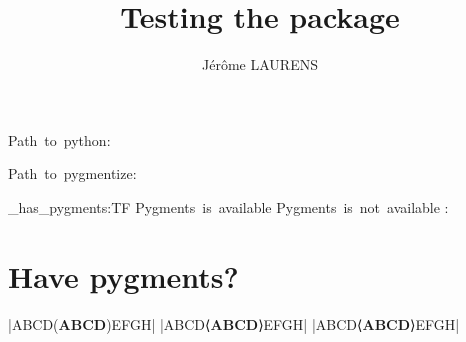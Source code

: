 \documentclass[10pt,a4paper]{article}
\begin{document}
\title{Testing the  package}
\author{Jérôme LAURENS}
\maketitle

\ExplSyntaxOn
\RenewDocumentCommand\CDRTest {} {
  \par\noindent
  Path~to~\textsf{python}:~\texttt{}
  \par\noindent
  Path~to~\textsf{pygmentize}:~\texttt{}
  \par\noindent
  \CDR_has_pygments:TF { Pygments~is~available } { Pygments~is~not~available
}:~%
  \par\noindent
}
\ExplSyntaxOff

\section{Have \textsf{pygments}?}
\CDRTest
{}
\CDRTest
\CDRCode[escapeinside=()]|ABCD(\textbf{ABCD})EFGH|
\CDRCode[escapeinside=⟨⟩]|ABCD⟨\textbf{ABCD}⟩EFGH|
\CDRCode[tags=src]|ABCD⟨\textbf{ABCD}⟩EFGH|
\end{document}
